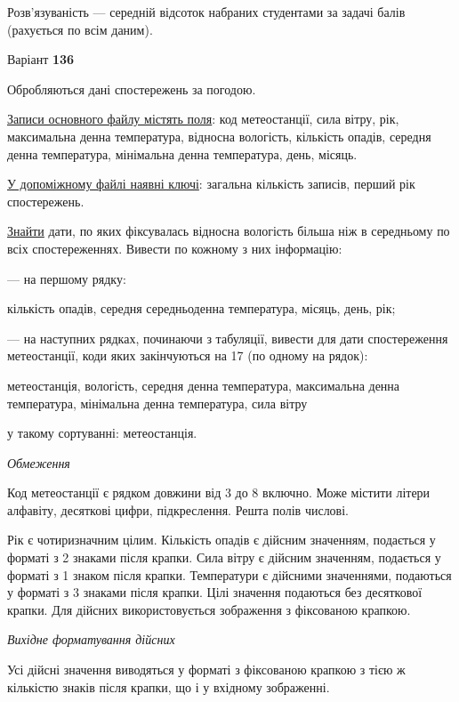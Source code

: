 \documentclass[11pt, ukrainian]{article}
\begin{document}
Розв'язуваність --- середній відсоток набраних студентами за задачі балів (рахується по всім даним).




\par
\newpage
{\center Варіант  \No \textbf { 136 }\par}
\bigskip
Обробляються дані спостережень за погодою. 

\underline{Записи основного файлу містять поля}: код метеостанції, сила вітру, рік, максимальна денна температура, відносна вологість, кількість опадів, середня денна температура, мінімальна денна температура, день, місяць.

\underline{У допоміжному файлі наявні ключі}: загальна кількість записів, перший рік спостережень.

\underline{Знайти} дати, по яких фіксувалась відносна вологість більша ніж в середньому по всіх спостереженнях. Вивести по кожному з них інформацію:\par
{\noindent}--- на першому рядку:\par
кількість опадів, середня середньоденна температура, місяць, день, рік;

{\noindent}--- на наступних рядках, починаючи з табуляції, вивести для дати спостереження метеостанції, коди яких закінчуються на 17 (по одному на рядок):\par
метеостанція, вологість, середня денна температура, максимальна денна температура, мінімальна денна температура, сила вітру

{\noindent}у такому сортуванні: метеостанція.


\bigskip\textit{Обмеження}

Код метеостанції є рядком довжини від 3 до 8 включно.
Може містити літери алфавіту, десяткові цифри, підкреслення. Решта полів числові.

Рік є чотиризначним цілим.
Кількість опадів є дійсним значенням, подається у форматі з 2 знаками після крапки.
Сила вітру є дійсним значенням, подається у форматі з 1 знаком після крапки.
Температури є дійсними значеннями, подаються у форматі з 3 знаками після крапки.
Цілі значення подаються без десяткової крапки.
Для дійсних використовується зображення з фіксованою крапкою.

\textit{Вихідне форматування дійсних}

Усі дійсні значення виводяться у форматі з фіксованою крапкою з тією ж кількістю знаків після крапки, що і у вхідному зображенні.
\end{document}
